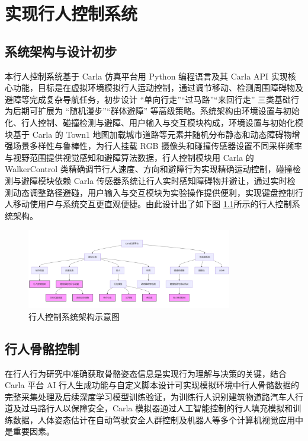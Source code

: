 \chapter{实现行人控制系统}

\section{系统架构与设计初步}

本行人控制系统基于 Carla 仿真平台用 Python 编程语言及其 Carla API 实现核心功能，目标是在虚拟环境模拟行人运动控制，通过调节移动、检测周围障碍物及避障等完成复杂导航任务，初步设计 “单向行走”“过马路”“来回行走” 三类基础行为后期可扩展为 “随机漫步”“群体避障” 等高级策略。系统架构由环境设置与初始化、行人控制、碰撞检测与避障、用户输入与交互模块构成，环境设置与初始化模块基于 Carla 的 Town1 地图加载城市道路等元素并随机分布静态和动态障碍物增强场景多样性与鲁棒性，为行人挂载 RGB 摄像头和碰撞传感器设置不同采样频率与视野范围提供视觉感知和避障算法数据，行人控制模块用 Carla 的 WalkerControl 类精确调节行人速度、方向和避障行为实现精确运动控制，碰撞检测与避障模块依赖 Carla 传感器系统让行人实时感知障碍物并避让，通过实时检测动态调整路径避碰，用户输入与交互模块为实验操作提供便利，实现键盘控制行人移动使用户与系统交互更直观便捷。由此设计出了如下图 \ref{fig:system_architecture}所示的行人控制系统架构。

\begin{figure}[H]
    \centering
    \includegraphics[width=0.8\textwidth]{images/system_architecture.pdf}
    \caption{行人控制系统架构示意图}
    \label{fig:system_architecture}
\end{figure}

\section{行人骨骼控制}

在行人行为研究中准确获取骨骼姿态信息是实现行为理解与决策的关键，结合 Carla 平台 AI 行人生成功能与自定义脚本设计可实现模拟环境中行人骨骼数据的完整采集处理及后续深度学习模型训练验证，为训练行人识别建筑物道路汽车人行道及过马路行人以保障安全，Carla 模拟器通过人工智能控制的行人填充模拟和训练数据，人体姿态估计在自动驾驶安全人群控制及机器人等多个计算机视觉应用中是重要因素。


